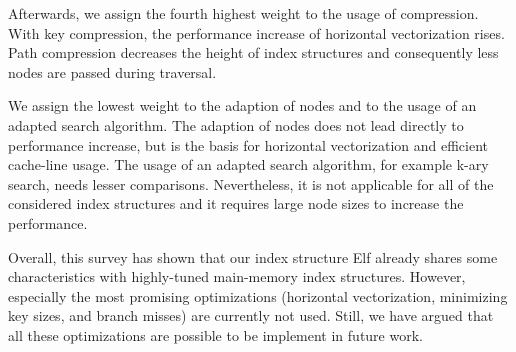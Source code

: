 \documentclass[runningheads,a4paper]{llncs}
\begin{document}
Afterwards, we assign the fourth highest weight to the usage of compression. With key compression, the performance increase of horizontal vectorization rises. Path compression decreases the height of index structures and consequently less nodes are passed during traversal. 

We assign the lowest weight to the adaption of nodes and to the usage of an adapted search algorithm. The adaption of nodes does not lead directly to performance increase, but is the basis for horizontal vectorization and efficient cache-line usage. The usage of an adapted search algorithm, for example k-ary search, needs lesser comparisons. Nevertheless, it is not applicable for all of the considered index structures and it requires large node sizes to increase the performance.  

Overall, this survey has shown that our index structure Elf already shares some characteristics with highly-tuned main-memory index structures. However, especially the most promising optimizations (horizontal vectorization, minimizing key sizes, and branch misses) are currently not used. Still, we have argued that all these optimizations are possible to be implement in future work.

\end{document}
